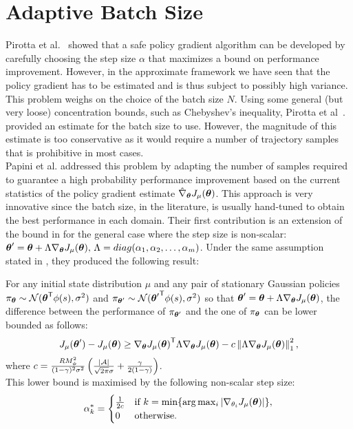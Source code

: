 \section{Adaptive Batch Size}
\label{sec:abs}
Pirotta et al.~\cite{adaptive_step} showed that a safe policy gradient algorithm can be developed by carefully choosing the step size $\alpha$ that maximizes a bound on performance improvement. However, in the approximate framework we have seen that the policy gradient has to be estimated and is thus subject to possibly high variance. This problem weighs on the choice of the batch size $N$. Using some general (but very loose) concentration bounds, such as Chebyshev's inequality, Pirotta et al~\cite{adaptive_step}. provided an estimate for the batch size to use. However, the magnitude of this estimate is too conservative as it would require a number of trajectory samples that is prohibitive in most cases.\\
Papini et al. \cite{adaptive_batch} addressed this problem by adapting the number of samples required to guarantee a high probability performance improvement based on the current statistics of the policy gradient estimate $\estgradj$. This approach is very innovative since the batch size, in the literature, is usually hand-tuned to obtain the best performance in each domain. Their first contribution is an extension of the bound in  for the general case where the step size is non-scalar: $\vtheta' = \vtheta + \Lambda \gradj,\, \Lambda=diag(\alpha_1, \alpha_2,\ldots,\alpha_m)$. Under the same assumption stated in , they produced the following result:
\begin{theorem}
For any initial state distribution $\mu$ and any pair of stationary Gaussian policies $\pi_{\vtheta}\sim\mathcal{N}(\transpose{\vtheta}\phi(s),\sigma^2)$ and $\pi_{\vtheta'}\sim\mathcal{N}(\transpose{\vtheta'}\phi(s),\sigma^2)$ so that $\vtheta' = \vtheta + \Lambda\gradj$, the difference between the performance of $\pi_{\vtheta'}$ and the one of $\pi_{\vtheta}$ can be lower bounded as follows:
\[
J_\mu(\vtheta') - J_\mu(\vtheta) \geq \transpose{\gradj}\Lambda\gradj - c\norm[1]{\Lambda\gradj}^2,
\]
where $c=\frac{RM_\phi^2}{(1-\gamma)^2\sigma^2}\left(\frac{|\aspace|}{\sqrt{2\pi}\sigma} + \frac{\gamma}{2(1-\gamma)}\right)$.\\
This lower bound is maximised by the following non-scalar step size:
\[
\alpha_k^* = \begin{cases} \frac{1}{2c} & \textrm{if }k=\min\{\arg\max_i|\nabla_{\theta_i} J_\mu(\vtheta)|\}, \\ 0 & \textrm{otherwise}.\end{cases}
\]
\end{theorem}

